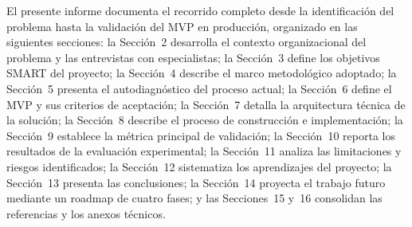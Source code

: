 El presente informe documenta el recorrido completo desde la identificación del
problema hasta la validación del MVP en producción, organizado en las siguientes
secciones: la Sección~2 desarrolla el contexto organizacional del problema y las
entrevistas con especialistas; la Sección~3 define los objetivos SMART del proyecto;
la Sección~4 describe el marco metodológico adoptado; la Sección~5 presenta el
autodiagnóstico del proceso actual; la Sección~6 define el MVP y sus criterios de
aceptación; la Sección~7 detalla la arquitectura técnica de la solución; la
Sección~8 describe el proceso de construcción e implementación; la Sección~9
establece la métrica principal de validación; la Sección~10 reporta los resultados
de la evaluación experimental; la Sección~11 analiza las limitaciones y riesgos
identificados; la Sección~12 sistematiza los aprendizajes del proyecto; la
Sección~13 presenta las conclusiones; la Sección~14 proyecta el trabajo futuro
mediante un roadmap de cuatro fases; y las Secciones~15 y~16 consolidan las
referencias y los anexos técnicos.